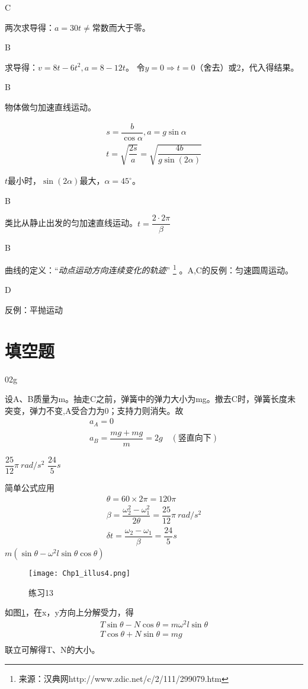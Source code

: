\documentclass[b5paper,opensource]{./template/qyxf-book}
\begin{document}
C

\solve 两次求导得：$a=30t\neq$常数而大于零。

B

\solve 求导得：$v=8t-6t^2,a=8-12t$。
令$y=0\Rightarrow t=0\text{（舍去）或}2$，代入得结果。

B

\solve 物体做匀加速直线运动。

\begin{gather*}
s=\dfrac{b}{\cos\alpha},a=g\sin\alpha\\
t=\sqrt{\dfrac{2s}{a}}=\sqrt{\dfrac{4b}{g\sin(2\alpha)}}
\end{gather*}

$t$最小时，$\sin(2\alpha)$最大，$\alpha=45^\circ$。

B

\solve 类比从静止出发的匀加速直线运动。$t=\dfrac{2\cdot 2\pi}{\beta}$

B

\solve 曲线的定义：“\textit{动点运动方向连续变化的轨迹}”
\footnote{来源：汉典网http://www.zdic.net/c/2/111/299079.htm}
。A,C的反例：匀速圆周运动。

D

\solve 反例：平抛运动

\section{填空题}
 0\qquad2g

\solve 设A、B质量为m。抽走C之前，弹簧中的弹力大小为mg。撤去C时，弹簧长度未突变，弹力不变,A受合力为0；支持力则消失。故
\begin{gather}
a_A=0 \\
a_B=\dfrac{mg+mg}{m}=2g\quad(\text{竖直向下})
\end{gather}

 $\dfrac{25}{12}\pi\ rad/s^2$ \qquad$\dfrac{24}{5}s$

\solve 简单公式应用
\begin{gather*}
\theta=60\times2\pi=120\pi\\
\beta=\dfrac{\omega_2^2-\omega_1^2}{2\theta}=\dfrac{25}{12}\pi\ rad/s^2\\
\delta t=\dfrac{\omega_2-\omega_1}{\beta}=\dfrac{24}{5}s
\end{gather*}
 $m(\sin\theta-\omega^2l\sin\theta\cos\theta)$

\solve
\begin{figure}[htbp]  %
	\centering
	\texttt{[image: Chp1\_illus4.png]}
	\caption{练习13}
	\label{fig:c1}
\end{figure}
如图\ref{fig:c1}，在x，y方向上分解受力，得  %
\begin{gather*}
T\sin\theta-N\cos\theta=m\omega^2l\sin\theta\\
T\cos\theta+N\sin\theta=mg\\
\end{gather*}
联立可解得T、N的大小。
\end{document}
